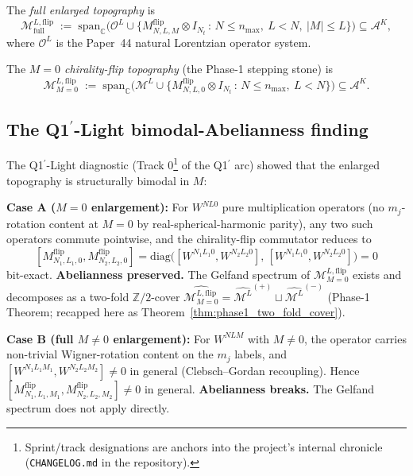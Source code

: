 \documentclass[11pt,a4paper]{article}
\theoremstyle{plain}
\theoremstyle{definition}
\newcommand{\nmax}{n_{\max}}
\newcommand{\Nt}{N_{t}}
\newcommand{\Acal}{\mathcal{A}}
\newcommand{\Mcal}{\mathcal{M}}
\newcommand{\Ocal}{\mathcal{O}}
\newcommand{\C}{\mathbb{C}}
\newcommand{\Z}{\mathbb{Z}}
\newcommand{\Mflipfull}{\Mcal^{L,\mathrm{flip}}_{\mathrm{full}}}
\newcommand{\MflipMzero}{\Mcal^{L,\mathrm{flip}}_{M=0}}
\newcommand{\Mflip}[3]{M^{\mathrm{flip}}_{#1,#2,#3}}
\newcommand{\Wspat}[3]{W^{#1#2#3}}
\begin{document}
The \emph{full enlarged topography} is
\begin{equation}
  \Mflipfull \;:=\; \mathrm{span}_{\C}\!\Big(\Ocal^{L}\cup\big\{\Mflip{N}{L}{M}\otimes I_{\Nt}\,:\,N\le\nmax,\ L<N,\ |M|\le L\big\}\Big)\subseteq\Acal^{K},
  \label{eq:full_topography}
\end{equation}
where $\Ocal^{L}$ is the Paper~44 natural Lorentzian operator system.

The \emph{$M=0$ chirality-flip topography} (the Phase-1 stepping
stone) is
\begin{equation}
  \MflipMzero \;:=\; \mathrm{span}_{\C}\!\Big(\Mcal^{L}\cup\big\{\Mflip{N}{L}{0}\otimes I_{\Nt}\,:\,N\le\nmax,\ L<N\big\}\Big)\subseteq\Acal^{K}.
  \label{eq:m0_topography}
\end{equation}

\subsection{The Q1$^{\prime}$-Light bimodal-Abelianness finding}
\label{sec:q1prime_light_recap}

The Q1$^{\prime}$-Light diagnostic (Track 0\footnote{Sprint/track designations are anchors into the project's internal chronicle (\texttt{CHANGELOG.md} in the repository).} of the Q1$^{\prime}$
arc) showed that the enlarged topography is structurally bimodal in
$M$:

\textbf{Case A ($M=0$ enlargement):} For $\Wspat{N}{L}{0}$ pure
multiplication operators (no $m_{j}$-rotation content at $M=0$ by
real-spherical-harmonic parity), any two such operators commute
pointwise, and the chirality-flip commutator reduces to
\[
  [\Mflip{N_{1}}{L_{1}}{0},\Mflip{N_{2}}{L_{2}}{0}] = \mathrm{diag}\!\big([\Wspat{N_{1}}{L_{1}}{0},\Wspat{N_{2}}{L_{2}}{0}],\,[\Wspat{N_{1}}{L_{1}}{0},\Wspat{N_{2}}{L_{2}}{0}]\big) = 0
\]
bit-exact. \textbf{Abelianness preserved.} The Gelfand spectrum of
$\MflipMzero$ exists and decomposes as a two-fold $\Z/2$-cover
$\widehat{\MflipMzero}=\widehat{\Mcal^{L}}^{(+)}\sqcup\widehat{\Mcal^{L}}^{(-)}$
(Phase-1 Theorem; recapped here as
Theorem~\ref{thm:phase1_two_fold_cover}).

\textbf{Case B (full $M\ne 0$ enlargement):} For $\Wspat{N}{L}{M}$
with $M\ne 0$, the operator carries non-trivial Wigner-rotation
content on the $m_{j}$ labels, and $[\Wspat{N_{1}}{L_{1}}{M_{1}},
\Wspat{N_{2}}{L_{2}}{M_{2}}]\ne 0$ in general (Clebsch--Gordan
recoupling). Hence $[\Mflip{N_{1}}{L_{1}}{M_{1}},
\Mflip{N_{2}}{L_{2}}{M_{2}}]\ne 0$ in general. \textbf{Abelianness
breaks.} The Gelfand spectrum does not apply directly.
\end{document}
